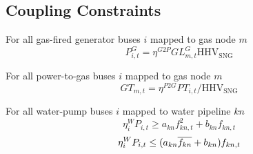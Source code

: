 \subsection{Coupling Constraints}

For all gas-fired generator buses $i$ mapped to gas node $m$ \atallt{}
\begin{equation}
  P^G_{i,t} = \eta^{G2P} GL^G_{m,t} \text{HHV}_{\text{SNG}}
\end{equation}

For all power-to-gas buses $i$ mapped to gas node $m$ \atallt{}
\begin{equation}
  GT_{m,t} =  \eta^{P2G} PT_{i,t} /\text{HHV}_\text{SNG}
\end{equation}

For all water-pump buses $i$ mapped to water pipeline $kn$ \atallt{}
\begin{equation}
  \eta^W_i P_{i,t} \geq a_{kn} f^2_{kn,t} + b_{kn} f_{kn,t}
\end{equation}
\begin{equation}
  \eta^W_i P_{i,t} \leq (a_{kn} \overline{f_{kn}} + b_{kn}) f_{kn,t}
\end{equation}
